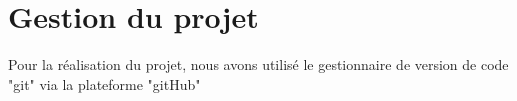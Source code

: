 \section{Gestion du projet}
\par Pour la réalisation du projet, nous avons utilisé le gestionnaire de version de code "git" via la plateforme "gitHub"
